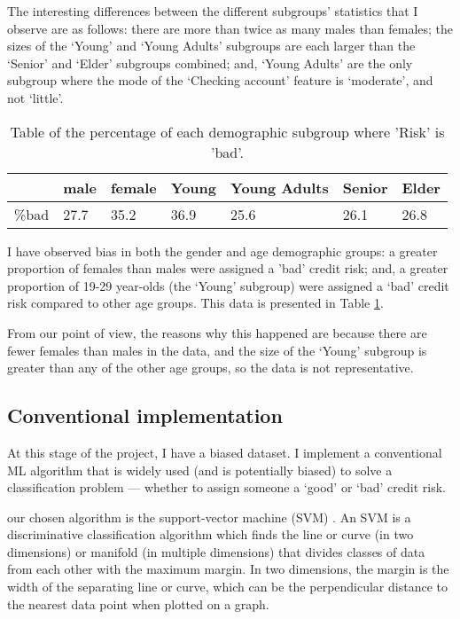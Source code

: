 \documentclass[conference]{IEEEtran}
\begin{document}
The interesting differences between the different subgroups' statistics that I observe are as follows: there are more than twice as many males than females; the sizes of the `Young' and `Young Adults' subgroups are each larger than the `Senior' and `Elder' subgroups combined; and, `Young Adults' are the only subgroup where the mode of the `Checking account' feature is `moderate', and not `little'. 

\begin{table}[h]
\begin{center}
\caption{Table of the percentage of each demographic subgroup where 'Risk' is 'bad'.}
\begin{tabularx}{0.49\textwidth} { |X|X|X|X|X|X|X| } 
    \hline
            & male & female & Young & Young Adults & Senior & Elder \\ 
        \hline
        \%bad & 27.7 & 35.2 & 36.9 & 25.6 & 26.1 & 26.8 \\
        \hline
\end{tabularx}
\label{table:4}
\end{center}
\end{table}

I have observed bias in both the gender and age demographic groups: a greater proportion of females than males were assigned a 'bad' credit risk; and, a greater proportion of 19-29 year-olds (the `Young' subgroup) were assigned a `bad' credit risk compared to other age groups. This data is presented in Table \ref{table:4}. 

From our point of view, the reasons why this happened are because there are fewer females than males in the data, and the size of the `Young' subgroup is greater than any of the other age groups, so the data is not representative.

\subsection{Conventional implementation}
At this stage of the project, I have a biased dataset. I implement a conventional ML algorithm that is widely used (and is potentially biased) to solve a classification problem --- whether to assign someone a `good' or `bad' credit risk.

our chosen algorithm is the support-vector machine (SVM) \cite{Cortes1995}. An SVM is a discriminative classification algorithm which finds the line or curve (in two dimensions) or manifold (in multiple dimensions) that divides classes of data from each other with the maximum margin. In two dimensions, the margin is the width of the separating line or curve, which can be the perpendicular distance to the nearest data point when plotted on a graph.
\end{document}
